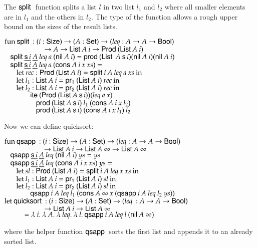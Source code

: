 The $\mathsf{split}\:$ function splits a list $l$ in two list $l_1$ and $l_2$ where all smaller elements are in $l_1$ and the others in $l_2$.
The type of the function allows a rough upper bound on the sizes of the result lists.
\begin{bsp}
$\mathrm{fun}\: \mathsf{split}\: : (i : \mathsf{Size} ) \rightarrow (A : \mathsf{Set} ) \rightarrow ( leq : A \rightarrow A \rightarrow \mathsf{Bool} ) $\\
$\spcx	\spcx \ra A \ra \List A \: i \ra \ProdT (\List A \: i)$\\
$\hspace*{3mm} \mathsf{split}\: \underline{\mathsf{s}\, i} \: \underline{A} \: leq \: a \: (\mathsf{nil}\: A \: i) = \mathsf{prod}\: (\mathsf{List}\: \: A \: \mathsf{s}\, i) (\mathsf{nil}\: A \: i) (\mathsf{nil}\: A \: i)$\\
$\hspace*{3mm} \mathsf{split}\: \underline{\mathsf{s}\, i} \: \underline{A} \: leq \: a \: (\mathsf{cons}\: A \: i \: x \:xs) = $\\ 
$\spc \spc \ELet{rec}{\ProdT (\List A \:i)}{\pivot i \: A \: leq \: a \: xs}$\\
$\spc \spc \ELet{l_1}{\List A \:i}{\pra (\List A \: i) \: rec}$\\
$\spc \spc \ELet{l_2}{\List A \:i}{\prb (\List A \: i) \: rec}$\\  
$\spc \spcx  \ite (\ProdT (\List A \: \s i)) (leq \: a \: x)  $\\
$\spc \spcx  \spc \prd (\List A \: \s i) \: l_1 \: (\cons A \: i \: x \: l_2)$\\
$\spc \spcx  \spc \prd (\List A \: \s i) \: (\cons A \: i \: x \: l_1) \: l_2$\\
\end{bsp}

Now we can define quicksort:
\begin{bsp}
$\mathrm{fun}\: \mathsf{qsapp}\: : (i : \mathsf{Size} ) \rightarrow ( A : \mathsf{Set} ) \rightarrow ( leq : A \rightarrow A \rightarrow \mathsf{Bool}) $\\
$\spcx \spcx \ra \List A \: i \ra \List A \: \infty \ra \List A \: \infty$\\
$\hspace*{3mm} \mathsf{qsapp}\: \underline{\mathsf{s}\, i} \: \underline{A} \: leq \: (\mathsf{nil}\: A \: i) \:             ys = ys$\\
$\hspace*{3mm} \mathsf{qsapp}\: \underline{\mathsf{s}\, i} \: \underline{A} \: leq \: (\mathsf{cons}\: A \: i \: x \: xs) \: ys = $\\
$\spc \spc  \ELet{sl}{\ProdT (\List A \:i)}{\pivot i \: A \: leq \: x \: xs}$\\
$\spc \spc  \ELet{l_1}{\List A \: i}{\pra (\List A \: i) \: sl}$\\
$\spc \spc  \ELet{l_2}{\List A \: i}{\prb (\List A \: i) \: sl}$\\
$\spc \spcx \qsapp i \: A \: leq \: l_1 \: (\cons A \: \infty \: x \: (\qsapp i \: A \: leq \: l_2 \: ys))$\\

$\mathrm{let}\: \mathsf{quicksort}\: : (i : \mathsf{Size} ) \rightarrow (A : \mathsf{Set} ) \rightarrow (\mathit{leq}\: : A \rightarrow A \rightarrow \mathsf{Bool})$\\ 
$\spcx \spcx \ra \List A\: i \ra \List A\: \infty$\\
$\spcx = \lam{i}\lam{A}\lam{leq}\lam{l} \qsapp i\: A\: leq \: l \: (\nil A\: \infty)$ 
\end{bsp}
where the helper function $\mathsf{qsapp}\:$ sorts the first list and appends it to an already sorted list.

